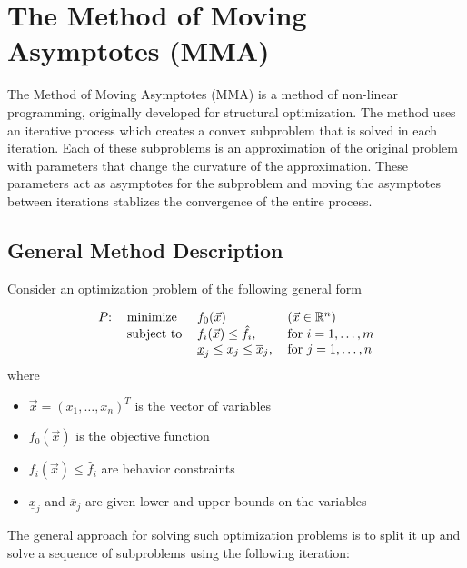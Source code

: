 \section{The Method of Moving Asymptotes (MMA)}\label{sec:MMA}

The Method of Moving Asymptotes (MMA) is a method of non-linear programming, originally developed for structural optimization. The method uses an iterative process which creates a convex subproblem that is solved in each iteration. Each of these subproblems is an approximation of the original problem with parameters that change the curvature of the approximation. These parameters act as asymptotes for the subproblem and moving the asymptotes between iterations stablizes the convergence of the entire process.

\subsection{General Method Description}
Consider an optimization problem of the following general form

\begin{equation}
	\begin{tabular}{llll}
		$P$: & minimize   & $f_0(\vec{x})$                                & $\left(\vec{x}\in\mathbb{R}^n\right)$ \\
		     & subject to & $f_i(\vec{x})\leq\hat{f}_i$,                  & for $i=1,\ldots,m$                    \\
		     &            & $\underline{x}_j\leq x_j\leq \overline{x}_j$, & for $j=1,\ldots,n$                    
	\end{tabular}
\end{equation}
where
\begin{itemize}
	\item $\vec{x}=\left(x_1,\ldots,x_n\right)^T$ is the vector of variables
	\item $f_0(\vec{x})$ is the objective function
	\item $f_i(\vec{x})\leq\hat{f}_i$ are behavior constraints
	\item $\underline{x}_j$ and $\overline{x}_j$ are given lower and upper bounds on the variables
\end{itemize}

The general approach for solving such optimization problems is to split it up and solve a sequence of subproblems using the following iteration:


